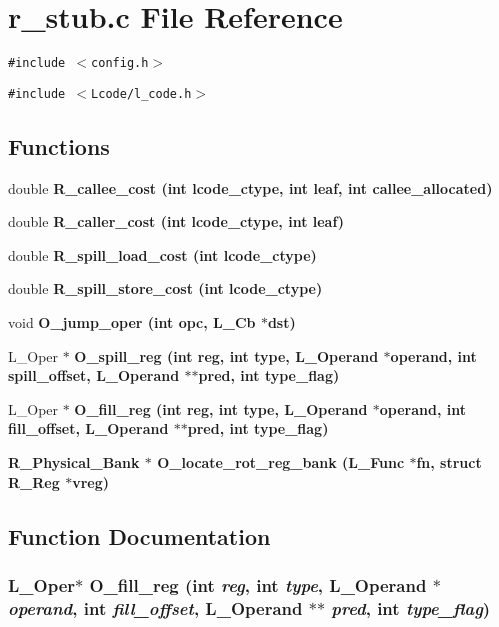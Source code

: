\section{r\_\-stub.c File Reference}
\label{r__stub_8c}
{\tt \#include $<$config.h$>$}\par
{\tt \#include $<$Lcode/l\_\-code.h$>$}\par
\subsection*{Functions}
\begin{CompactItemize}
\item 
double \bf{R\_\-callee\_\-cost} (int lcode\_\-ctype, int leaf, int callee\_\-allocated)
\item 
double \bf{R\_\-caller\_\-cost} (int lcode\_\-ctype, int leaf)
\item 
double \bf{R\_\-spill\_\-load\_\-cost} (int lcode\_\-ctype)
\item 
double \bf{R\_\-spill\_\-store\_\-cost} (int lcode\_\-ctype)
\item 
void \bf{O\_\-jump\_\-oper} (int opc, L\_\-Cb $\ast$dst)
\item 
L\_\-Oper $\ast$ \bf{O\_\-spill\_\-reg} (int reg, int type, L\_\-Operand $\ast$operand, int spill\_\-offset, L\_\-Operand $\ast$$\ast$pred, int type\_\-flag)
\item 
L\_\-Oper $\ast$ \bf{O\_\-fill\_\-reg} (int reg, int type, L\_\-Operand $\ast$operand, int fill\_\-offset, L\_\-Operand $\ast$$\ast$pred, int type\_\-flag)
\item 
\bf{R\_\-Physical\_\-Bank} $\ast$ \bf{O\_\-locate\_\-rot\_\-reg\_\-bank} (L\_\-Func $\ast$fn, struct \bf{R\_\-Reg} $\ast$vreg)
\end{CompactItemize}


\subsection{Function Documentation}
\subsubsection{\setlength{\rightskip}{0pt plus 5cm}L\_\-Oper$\ast$ O\_\-fill\_\-reg (int {\em reg}, int {\em type}, L\_\-Operand $\ast$ {\em operand}, int {\em fill\_\-offset}, L\_\-Operand $\ast$$\ast$ {\em pred}, int {\em type\_\-flag})}\label{r__stub_8c_9f7d468e025a4f50218cb5c0927aac50}




